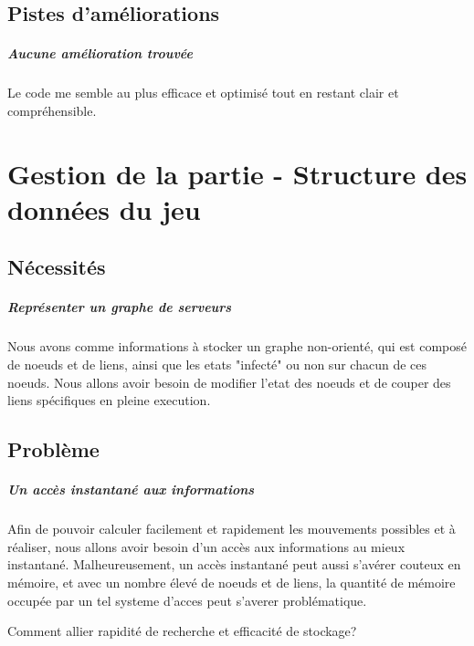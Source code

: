 \documentclass{scrreprt}
\begin{document}
    \section{Pistes d'améliorations}

    \paragraph{Aucune amélioration trouvée}
    Le code me semble au plus efficace et optimisé tout en restant clair et
    compréhensible.



    \chapter{Gestion de la partie - Structure des données du jeu}

    \section{Nécessités}

    \paragraph{Représenter un graphe de serveurs}
    Nous avons comme informations à stocker un graphe non-orienté, qui est
    composé de noeuds et de liens, ainsi que les etats "infecté" ou non sur
    chacun de ces noeuds.
    Nous allons avoir besoin de modifier l'etat des noeuds et de couper des
    liens spécifiques en pleine execution.

    \section{Problème}

    \paragraph{Un accès instantané aux informations}
    Afin de pouvoir calculer facilement et rapidement les mouvements
    possibles et à réaliser, nous allons avoir besoin d'un accès aux
    informations au mieux instantané.
    Malheureusement, un accès instantané peut aussi s'avérer couteux en
    mémoire, et avec un nombre élevé de noeuds et de liens, la quantité de
    mémoire occupée par un tel systeme d'acces peut s'averer problématique.

    \begin{problem}
        Comment allier rapidité de recherche et efficacité de stockage?
    \end{problem}
\end{document}
